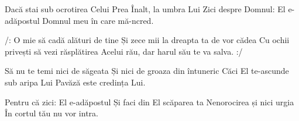
\beginverse
Dacă stai sub ocrotirea
Celui Prea Înalt, la umbra Lui
Zici despre Domnul: El e-adăpostul
Domnul meu în care mă-ncred.
\endverse

\beginchorus
/: O mie să cadă alături de tine
Și zece mii la dreapta ta de vor cădea
Cu ochii privești să vezi răsplătirea
Acelui rău, dar harul său te va salva. :/
\endchorus

\beginverse
Să nu te temi nici de săgeata
Și nici de groaza din întuneric
Căci El te-ascunde sub aripa Lui
Pavăză este credința Lui.
\endverse

\beginverse
Pentru că zici: El e-adăpostul
Și faci din El scăparea ta
Nenorocirea și nici urgia
În cortul tău nu vor intra.
\endverse

\endsong